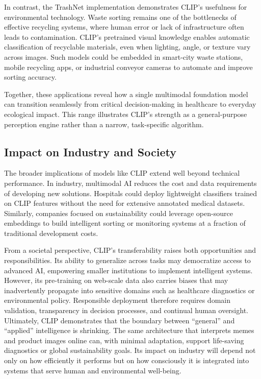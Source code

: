 \documentclass[12pt]{article}
\begin{document}
In contrast, the TrashNet implementation demonstrates CLIP’s usefulness for environmental technology. Waste sorting remains one of the bottlenecks of effective recycling systems, where human error or lack of infrastructure often leads to contamination. CLIP’s pretrained visual knowledge enables automatic classification of recyclable materials, even when lighting, angle, or texture vary across images. Such models could be embedded in smart-city waste stations, mobile recycling apps, or industrial conveyor cameras to automate and improve sorting accuracy.  
\vspace{0.3em}

Together, these applications reveal how a single multimodal foundation model can transition seamlessly from critical decision-making in healthcare to everyday ecological impact. This range illustrates CLIP’s strength as a general-purpose perception engine rather than a narrow, task-specific algorithm.

\subsection{Impact on Industry and Society}
The broader implications of models like CLIP extend well beyond technical performance. In industry, multimodal AI reduces the cost and data requirements of developing new solutions. Hospitals could deploy lightweight classifiers trained on CLIP features without the need for extensive annotated medical datasets. Similarly, companies focused on sustainability could leverage open-source embeddings to build intelligent sorting or monitoring systems at a fraction of traditional development costs.  
\vspace{0.3em}

From a societal perspective, CLIP’s transferability raises both opportunities and responsibilities. Its ability to generalize across tasks may democratize access to advanced AI, empowering smaller institutions to implement intelligent systems. However, its pre-training on web-scale data also carries biases that may inadvertently propagate into sensitive domains such as healthcare diagnostics or environmental policy. Responsible deployment therefore requires domain validation, transparency in decision processes, and continual human oversight.  
\vspace{0.3em}
Ultimately, CLIP demonstrates that the boundary between “general” and “applied” intelligence is shrinking. The same architecture that interprets memes and product images online can, with minimal adaptation, support life-saving diagnostics or global sustainability goals. Its impact on industry will depend not only on how efficiently it performs but on how consciously it is integrated into systems that serve human and environmental well-being.
\end{document}
